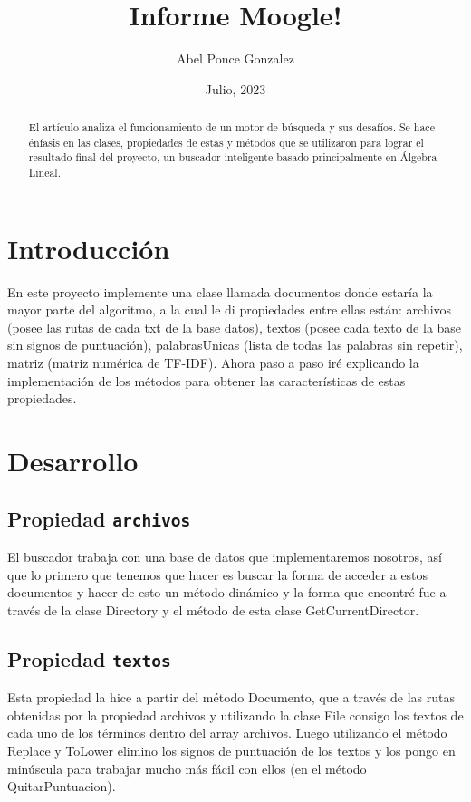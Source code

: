 \documentclass [a4paper,12pt]{article}
\begin{document}
\title{Informe Moogle!}
\author{Abel Ponce Gonzalez}
\date{Julio, 2023}
\maketitle
\newpage
\tableofcontents
\newpage
\begin {abstract}
El artículo analiza el funcionamiento de un motor de búsqueda y sus desafíos. Se hace énfasis en las clases, propiedades de estas y métodos que se utilizaron para lograr el resultado final del proyecto, un buscador inteligente basado principalmente en Álgebra Lineal. 
\end{abstract}
\newpage
\section{Introducción}\label{sec:intro}
En este proyecto implemente una clase llamada documentos donde estaría la mayor parte del algoritmo, a la cual le di propiedades entre ellas están: archivos (posee las rutas de cada txt de la base datos), textos (posee cada texto de la base sin signos de puntuación), palabrasUnicas (lista de todas las palabras sin repetir), matriz (matriz numérica de TF-IDF). Ahora paso a paso iré explicando la implementación de los métodos para obtener las características de estas propiedades.
\newpage
\section{Desarrollo}\label{sec: ent}
\subsection{Propiedad \texttt{archivos}}\label{sub:center}
El buscador trabaja con una base de datos que implementaremos nosotros, así que lo primero que tenemos que hacer es buscar la forma de acceder a estos documentos y hacer de esto un método dinámico y la forma que encontré fue a través de la clase Directory y el método de esta clase GetCurrentDirector.
\subsection{Propiedad \texttt{textos}}\label{sub:center}
Esta propiedad la hice a partir del método Documento, que a través de las rutas obtenidas por la propiedad archivos y utilizando la clase File consigo los textos de cada uno de los términos dentro del array archivos. Luego utilizando el método Replace y ToLower elimino los signos de puntuación de los textos y los pongo en minúscula para trabajar mucho más fácil con ellos (en el método QuitarPuntuacion). 
\end{document}
